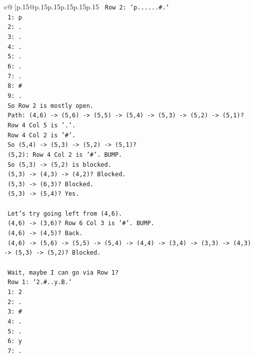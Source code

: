 \documentclass{article}
\begin{document}
{\begin{supertabular}{c@{$\;$}|p{.15\linewidth}@{}p{.15\linewidth}p{.15\linewidth}p{.15\linewidth}p{.15\linewidth}p{.15\linewidth}}
{{{\texttt{   Row 2: `p......\#.`} \\
\texttt{   1: p} \\
\texttt{   2: .} \\
\texttt{   3: .} \\
\texttt{   4: .} \\
\texttt{   5: .} \\
\texttt{   6: .} \\
\texttt{   7: .} \\
\texttt{   8: \#} \\
\texttt{   9: .} \\
\texttt{   So Row 2 is mostly open.} \\
\texttt{   Path: (4,6) {-}> (5,6) {-}> (5,5) {-}> (5,4) {-}> (5,3) {-}> (5,2) {-}> (5,1)?} \\
\texttt{   Row 4 Col 5 is '.'.} \\
\texttt{   Row 4 Col 2 is '\#'.} \\
\texttt{   So (5,4) {-}> (5,3) {-}> (5,2) {-}> (5,1)?} \\
\texttt{   (5,2): Row 4 Col 2 is '\#'. BUMP.} \\
\texttt{   So (5,3) {-}> (5,2) is blocked.} \\
\texttt{   (5,3) {-}> (4,3) {-}> (4,2)? Blocked.} \\
\texttt{   (5,3) {-}> (6,3)? Blocked.} \\
\texttt{   (5,3) {-}> (5,4)? Yes.} \\
\\ 
\texttt{   Let's try going left from (4,6).} \\
\texttt{   (4,6) {-}> (3,6)? Row 6 Col 3 is '\#'. BUMP.} \\
\texttt{   (4,6) {-}> (4,5)? Back.} \\
\texttt{   (4,6) {-}> (5,6) {-}> (5,5) {-}> (5,4) {-}> (4,4) {-}> (3,4) {-}> (3,3) {-}> (4,3) {-}> (5,3) {-}> (5,2)? Blocked.} \\
\\ 
\texttt{   Wait, maybe I can go via Row 1?} \\
\texttt{   Row 1: `2.\#..y.B.`} \\
\texttt{   1: 2} \\
\texttt{   2: .} \\
\texttt{   3: \#} \\
\texttt{   4: .} \\
\texttt{   5: .} \\
\texttt{   6: y} \\
\texttt{   7: .} \\
}}}
\end{supertabular}}
\end{document}
